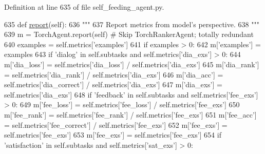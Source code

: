Definition at line 635 of file self\+\_\+feeding\+\_\+agent.\+py.


\begin{DoxyCode}
635     \textcolor{keyword}{def }\hyperlink{namespaceprojects_1_1convai2_1_1eval__f1_a01a47b9c08dad189837a51f085defc45}{report}(self):
636         \textcolor{stringliteral}{"""}
637 \textcolor{stringliteral}{        Report metrics from model's perspective.}
638 \textcolor{stringliteral}{        """}
639         m = TorchAgent.report(self)  \textcolor{comment}{# Skip TorchRankerAgent; totally redundant}
640         examples = self.metrics[\textcolor{stringliteral}{'examples'}]
641         \textcolor{keywordflow}{if} examples > 0:
642             m[\textcolor{stringliteral}{'examples'}] = examples
643             \textcolor{keywordflow}{if} \textcolor{stringliteral}{'dialog'} \textcolor{keywordflow}{in} self.subtasks \textcolor{keywordflow}{and} self.metrics[\textcolor{stringliteral}{'dia\_exs'}] > 0:
644                 m[\textcolor{stringliteral}{'dia\_loss'}] = self.metrics[\textcolor{stringliteral}{'dia\_loss'}] / self.metrics[\textcolor{stringliteral}{'dia\_exs'}]
645                 m[\textcolor{stringliteral}{'dia\_rank'}] = self.metrics[\textcolor{stringliteral}{'dia\_rank'}] / self.metrics[\textcolor{stringliteral}{'dia\_exs'}]
646                 m[\textcolor{stringliteral}{'dia\_acc'}] = self.metrics[\textcolor{stringliteral}{'dia\_correct'}] / self.metrics[\textcolor{stringliteral}{'dia\_exs'}]
647                 m[\textcolor{stringliteral}{'dia\_exs'}] = self.metrics[\textcolor{stringliteral}{'dia\_exs'}]
648             \textcolor{keywordflow}{if} \textcolor{stringliteral}{'feedback'} \textcolor{keywordflow}{in} self.subtasks \textcolor{keywordflow}{and} self.metrics[\textcolor{stringliteral}{'fee\_exs'}] > 0:
649                 m[\textcolor{stringliteral}{'fee\_loss'}] = self.metrics[\textcolor{stringliteral}{'fee\_loss'}] / self.metrics[\textcolor{stringliteral}{'fee\_exs'}]
650                 m[\textcolor{stringliteral}{'fee\_rank'}] = self.metrics[\textcolor{stringliteral}{'fee\_rank'}] / self.metrics[\textcolor{stringliteral}{'fee\_exs'}]
651                 m[\textcolor{stringliteral}{'fee\_acc'}] = self.metrics[\textcolor{stringliteral}{'fee\_correct'}] / self.metrics[\textcolor{stringliteral}{'fee\_exs'}]
652                 m[\textcolor{stringliteral}{'fee\_exs'}] = self.metrics[\textcolor{stringliteral}{'fee\_exs'}]
653                 m[\textcolor{stringliteral}{'fee\_exs'}] = self.metrics[\textcolor{stringliteral}{'fee\_exs'}]
654             \textcolor{keywordflow}{if} \textcolor{stringliteral}{'satisfaction'} \textcolor{keywordflow}{in} self.subtasks \textcolor{keywordflow}{and} self.metrics[\textcolor{stringliteral}{'sat\_exs'}] > 0:

\end{DoxyCode}

